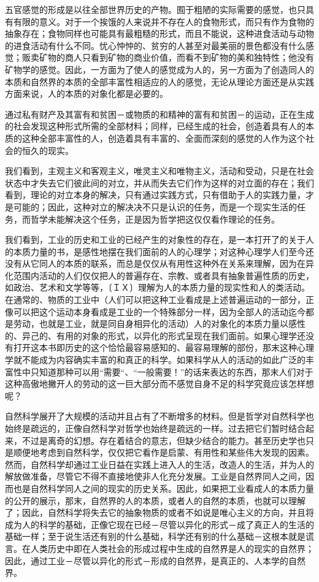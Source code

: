 \documentclass[a4paper,twoside,12pt,AutoFakeBold]{ctexart}
\begin{document}
五官感觉的形成是以往全部世界历史的产物。囿于粗陋的实际需要的感觉，也只具有有限的意义。对于一个挨饿的人来说并不存在人的食物形式，而只有作为食物的抽象存在；食物同样也可能具有最粗糙的形式，而且不能说，这种进食活动与动物的进食活动有什么不同。忧心忡忡的、贫穷的人甚至对最美丽的景色都没有什么感觉；贩卖矿物的商人只看到矿物的商业价值，而看不到矿物的美和独特性；他没有矿物学的感觉。因此，一方面为了使人的感觉成为人的，另一方面为了创造同人的本质和自然界的本质的全部丰富性相适应的人的感觉，无论从理论方面还是从实践方面来说，人的本质的对象化都是必要的。

通过私有财产及其富有和贫困－或物质的和精神的富有和贫困－的运动，正在生成的社会发现这种形式所需的全部材料；同样，已经生成的社会，创造着具有人的本质的这种全部丰富性的人，创造着具有丰富的、全面而深刻的感觉的人作为这个社会的恒久的现实。

我们看到，主观主义和客观主义，唯灵主义和唯物主义，活动和受动，只是在社会状态中才失去它们彼此间的对立，并从而失去它们作为这样的对立面的存在；我们看到，理论的对立本身的解决，只有通过实践方式，只有借助于人的实践力量，才是可能的；因此，这种对立的解决决不只是认识的任务，而是一个现实生活的任务，而哲学未能解决这个任务，正是因为哲学把这仅仅看作理论的任务。

我们看到，工业的历史和工业的已经产生的对象性的存在，是一本打开了的关于人的本质力量的书，是感性地摆在我们面前的人的心理学；对这种心理学人们至今还没有从它同人的本质的联系，而总是仅仅从有用性这种外在关系来理解，因为在异化范围内活动的人们仅仅把人的普遍存在、宗教、或者具有抽象普遍性质的历史，如政治、艺术和文学等等，〔ＩＸ〕理解为人的本质力量的现实性和人的类活动。在通常的、物质的工业中（人们可以把这种工业看成是上述普遍运动的一部分，正像可以把这个运动本身看成是工业的一个特殊部分一样，因为全部人的活动迄今都是劳动，也就是工业，就是同自身相异化的活动）人的对象化的本质力量以感性的、异己的、有用的对象的形式，以异化的形式呈现在我们面前。如果心理学还没有打开这本书即历史的这个恰恰最容易感知的、最容易理解的部份，那末这种心理学就不能成为内容确实丰富的和真正的科学。如果科学从人的活动的如此广泛的丰富性中只知道那种可以用“需要“、“一般需要！”的话来表达的东西，那末人们对于这种高傲地撇开人的劳动的这一巨大部分而不感觉自身不足的科学究竟应该怎样想呢？

自然科学展开了大规模的活动并且占有了不断增多的材料。但是哲学对自然科学也始终是疏远的，正像自然科学对哲学也始终是疏远的一样。过去把它们暂时结合起来，不过是离奇的幻想。存在着结合的意志，但缺少结合的能力。甚至历史学也只是顺便地考虑到自然科学，仅仅把它看作是启蒙、有用性和某些伟大发现的因素。然而，自然科学却通过工业日益在实践上进入人的生活，改造人的生活，并为人的解放做准备，尽管它不得不直接地使非人化充分发展。工业是自然界同人之间，因而也是自然科学同人之间的现实的历史关系。因此，如果把工业看成人的本质力量的公开的展示，那末，自然界的人的本质，或者人的自然的本质，也就可以理解了；因此，自然科学将失去它的抽象物质的或者不如说是唯心主义的方向，并且将成为人的科学的基础，正像它现在已经－尽管以异化的形式－成了真正人的生活的基础一样；至于说生活还有别的什么基础，科学还有别的什么基础－这根本就是谎言。在人类历史中即在人类社会的形成过程中生成的自然界是人的现实的自然界；因此，通过工业－尽管以异化的形式－形成的自然界，是真正的、人本学的自然界。
\end{document}
